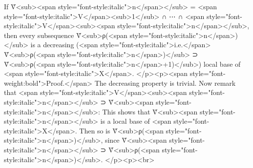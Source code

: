 {{{{If 
Ṽ<sub><span style="font-style:italic">n</span></sub> = <span style="font-style:italic">V</span><sub>1</sub> ∩ ⋯ ∩ <span style="font-style:italic">V</span><sub><span style="font-style:italic">n</span></sub>, 
then every subsequence 
{Ṽ<sub>ρ(<span style="font-style:italic">n</span>)</sub>} 
is a decreasing (<span style="font-style:italic">i.e.</span> Ṽ<sub>ρ(<span style="font-style:italic">n</span>)</sub> ⊃ Ṽ<sub>ρ(<span style="font-style:italic">n</span>+1)</sub>)
local base of <span style="font-style:italic">X</span>.
</p><p><span style="font-weight:bold">Proof.</span>
The decreasing property is trivial. Now remark that 
<span style="font-style:italic">V</span><sub><span style="font-style:italic">n</span></sub> ⊃ Ṽ<sub><span style="font-style:italic">n</span></sub>:
This shows that 
{Ṽ<sub><span style="font-style:italic">n</span></sub>} 
is a local base of <span style="font-style:italic">X</span>. Then so is 
{Ṽ<sub>ρ(<span style="font-style:italic">n</span>)</sub>},
since Ṽ<sub><span style="font-style:italic">n</span></sub> ⊃ Ṽ<sub>ρ(<span style="font-style:italic">n</span>)</sub>.
</p><p><br>

}}}}
